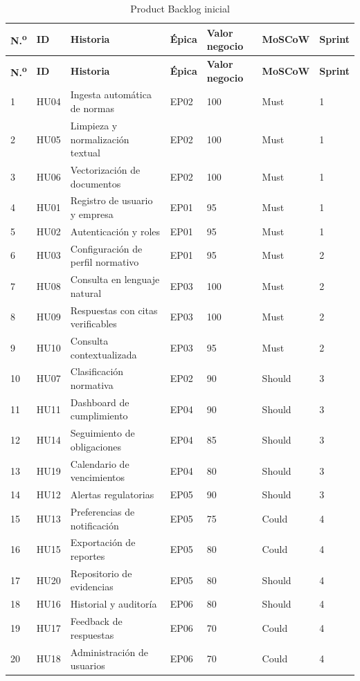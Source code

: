 \documentclass[12pt,a4paper,oneside]{report}
\begin{document}
\begin{longtable}{p{}p{}p{}p{}p{}p{}p{}}
\caption{Product Backlog inicial}\label{tab:cap3-product-backlog}\\
\toprule
\textbf{N.\textsuperscript{o}} & \textbf{ID} & \textbf{Historia} & \textbf{Épica} & \textbf{Valor negocio} & \textbf{MoSCoW} & \textbf{Sprint} \\
\midrule
\endfirsthead
\toprule
\textbf{N.\textsuperscript{o}} & \textbf{ID} & \textbf{Historia} & \textbf{Épica} & \textbf{Valor negocio} & \textbf{MoSCoW} & \textbf{Sprint} \\
\midrule
\endhead
1 & HU04 & Ingesta automática de normas & EP02 & 100 & Must & 1 \\
2 & HU05 & Limpieza y normalización textual & EP02 & 100 & Must & 1 \\
3 & HU06 & Vectorización de documentos & EP02 & 100 & Must & 1 \\
4 & HU01 & Registro de usuario y empresa & EP01 & 95 & Must & 1 \\
5 & HU02 & Autenticación y roles & EP01 & 95 & Must & 1 \\
6 & HU03 & Configuración de perfil normativo & EP01 & 95 & Must & 2 \\
7 & HU08 & Consulta en lenguaje natural & EP03 & 100 & Must & 2 \\
8 & HU09 & Respuestas con citas verificables & EP03 & 100 & Must & 2 \\
9 & HU10 & Consulta contextualizada & EP03 & 95 & Must & 2 \\
10 & HU07 & Clasificación normativa & EP02 & 90 & Should & 3 \\
11 & HU11 & Dashboard de cumplimiento & EP04 & 90 & Should & 3 \\
12 & HU14 & Seguimiento de obligaciones & EP04 & 85 & Should & 3 \\
13 & HU19 & Calendario de vencimientos & EP04 & 80 & Should & 3 \\
14 & HU12 & Alertas regulatorias & EP05 & 90 & Should & 3 \\
15 & HU13 & Preferencias de notificación & EP05 & 75 & Could & 4 \\
16 & HU15 & Exportación de reportes & EP05 & 80 & Could & 4 \\
17 & HU20 & Repositorio de evidencias & EP05 & 80 & Should & 4 \\
18 & HU16 & Historial y auditoría & EP06 & 80 & Should & 4 \\
19 & HU17 & Feedback de respuestas & EP06 & 70 & Could & 4 \\
20 & HU18 & Administración de usuarios & EP06 & 70 & Could & 4 \\
\bottomrule
\end{longtable}
\end{document}
